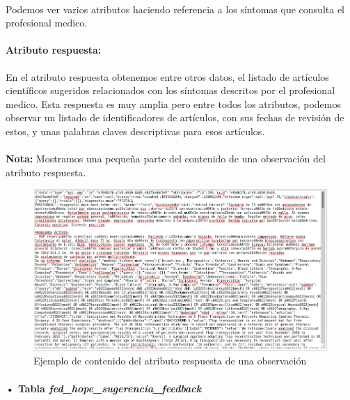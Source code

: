 \documentclass[10pt,a4paper,oneside]{book}
\begin{document}
\lstset{inputencoding=utf8/latin1}


\paragraph{}
Podemos ver varios atributos haciendo referencia a los síntomas que consulta el profesional medico.

\paragraph{\textbf{Atributo respuesta}: } En el atributo respuesta obtenemos entre otros datos, el listado de artículos científicos sugeridos relacionados con los síntomas descritos por el profesional medico. Esta respuesta es muy amplia pero entre todos los atributos, podemos observar un listado de identificadores de artículos, con sus fechas de revisión de estos, y unas palabras claves descriptivas para esos artículos.

\paragraph{}
\textbf{Nota:} Mostramos una pequeña parte del contenido de una observación del atributo respuesta.
\begin{figure}[!htb]
  \centering
  \includegraphics[width=15cm]{images/metodologia_tabla_fed_hope_sugerencia_attribute_respuesta.png}
  \caption{Ejemplo de contenido del atributo respuesta de una observación}
\end{figure}

\newpage
\paragraph{• Tabla \textit{fed\_hope\_sugerencia\_feedback}}
\end{document}
